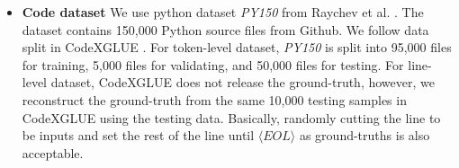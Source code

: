 \begin{itemize}
    \item \textbf{Code dataset} We use python dataset \textit{PY150} from Raychev et al. \cite{raychev2016probabilistic}. The dataset contains 150,000 Python source files from Github. We follow data split in CodeXGLUE \cite{lu2021codexglue}. For token-level dataset, \textit{PY150} is split into 95,000 files for training, 5,000 files for validating, and 50,000 files for testing. For line-level dataset, CodeXGLUE does not release the ground-truth, however, we reconstruct the ground-truth from the same 10,000 testing samples in CodeXGLUE \cite{lu2021codexglue} using the testing data.  Basically, randomly cutting the line to be inputs and set the rest of the line until $\langle EOL \rangle$ as ground-truths is also acceptable. 
    
    

\end{itemize}
